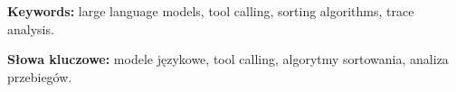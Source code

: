 \begin{abstract}
\end{abstract}
\noindent\textbf{Keywords:} large language models, tool calling, sorting algorithms, trace analysis.

\begin{otherlanguage}{polish}
\begin{abstract}
\end{abstract}
\noindent\textbf{Słowa kluczowe:} modele językowe, tool calling, algorytmy sortowania, analiza przebiegów.
\end{otherlanguage}
